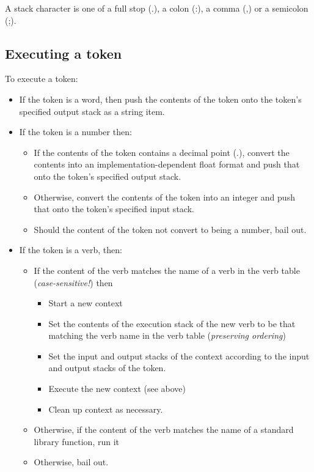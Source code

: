 \documentclass{article}
\begin{document}
{{{{{\noindent A stack character is one of a full stop (.), a colon (:), a comma (,) or a semicolon (;).

\subsection{Executing a token}

To execute a token:

\begin{itemize}
\item If the token is a word, then push the contents of the token onto the token's specified output stack as a string item.
\item If the token is a number then:
\begin{itemize}
\item If the contents of the token contains a decimal point (.), convert the contents into an implementation-dependent float format and push that onto the token's specified output stack.
\item Otherwise, convert the contents of the token into an integer and push that onto the token's specified input stack.
\item Should the content of the token not convert to being a number, bail out.
\end{itemize}
\item If the token is a verb, then:
\begin{itemize}
\item If the content of the verb matches the name of a verb in the verb table (\emph{case-sensitive!}) then
\begin{itemize}
\item Start a new context
\item Set the contents of the execution stack of the new verb to be that matching the verb name in the verb table (\emph{preserving ordering})
\item Set the input and output stacks of the context according to the input and output stacks of the token.
\item Execute the new context (see above)
\item Clean up context as necessary.
\end{itemize}
\item Otherwise, if the content of the verb matches the name of a standard library function, run it
\item Otherwise, bail out.
\end{itemize}
\end{itemize}

}}}}}
\end{document}

